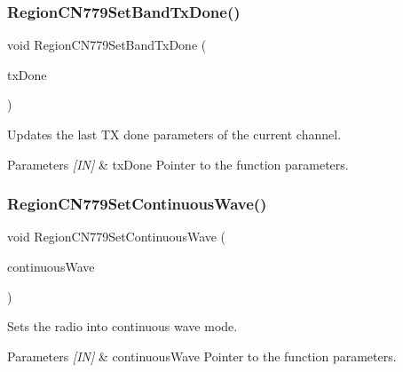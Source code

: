 \subsubsection{\texorpdfstring{Region\+C\+N779\+Set\+Band\+Tx\+Done()}{RegionCN779SetBandTxDone()}}
{\footnotesize\ttfamily void Region\+C\+N779\+Set\+Band\+Tx\+Done (\begin{DoxyParamCaption}\item[{\hyperlink{group__REGION_gad0524aa0673c0814a71e7a4f9cade3fc}{Set\+Band\+Tx\+Done\+Params\+\_\+t} $\ast$}]{tx\+Done }\end{DoxyParamCaption})}



Updates the last TX done parameters of the current channel. 


\begin{DoxyParams}{Parameters}
{\em \mbox{[}\+I\+N\mbox{]}} & tx\+Done Pointer to the function parameters. \\
\hline
\end{DoxyParams}
\mbox{\label{group__REGIONCN779_ga702d0d0348fdbcb2b66f7e9d5fb93a61}} 
\subsubsection{\texorpdfstring{Region\+C\+N779\+Set\+Continuous\+Wave()}{RegionCN779SetContinuousWave()}}
{\footnotesize\ttfamily void Region\+C\+N779\+Set\+Continuous\+Wave (\begin{DoxyParamCaption}\item[{\hyperlink{group__REGION_gaf39bb5ba06921139c6d17f88a8d518cd}{Continuous\+Wave\+Params\+\_\+t} $\ast$}]{continuous\+Wave }\end{DoxyParamCaption})}



Sets the radio into continuous wave mode. 


\begin{DoxyParams}{Parameters}
{\em \mbox{[}\+I\+N\mbox{]}} & continuous\+Wave Pointer to the function parameters. \\
\hline
\end{DoxyParams}
\mbox{\label{group__REGIONCN779_gae628efcfcba9afc2620f3c1234b90c3d}} 
